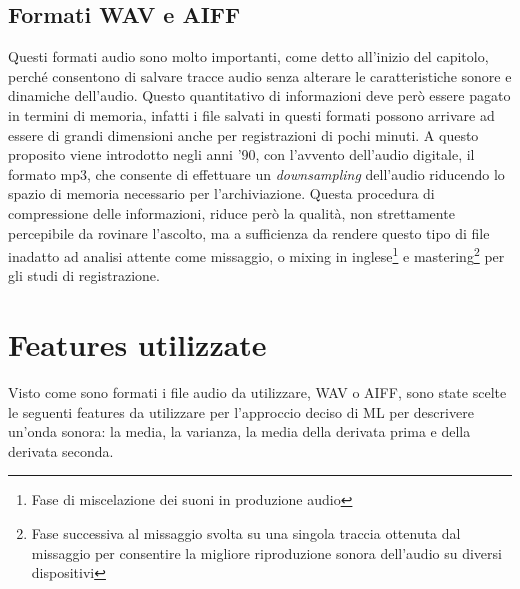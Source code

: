 \subsection{Formati WAV e AIFF}
Questi formati audio sono molto importanti, come detto all'inizio del capitolo, perché consentono di salvare tracce audio senza alterare le caratteristiche sonore e dinamiche dell'audio. Questo quantitativo di informazioni deve però essere pagato in termini di memoria, infatti i file salvati in questi formati possono arrivare ad essere di grandi dimensioni anche per registrazioni di pochi minuti. A questo proposito viene introdotto negli anni '90, con l'avvento dell'audio digitale, il formato mp3, che consente di effettuare un \emph{downsampling} dell'audio riducendo lo spazio di memoria necessario per l'archiviazione. Questa procedura di compressione delle informazioni, riduce però la qualità, non strettamente percepibile da rovinare l'ascolto, ma a sufficienza da rendere questo tipo di file inadatto ad analisi attente come missaggio, o mixing in inglese\footnote{Fase di miscelazione dei suoni in produzione audio} e mastering\footnote{Fase successiva al missaggio svolta su una singola traccia ottenuta dal missaggio per consentire la migliore riproduzione sonora dell'audio su diversi dispositivi} per gli studi di registrazione.

\section{Features utilizzate}
Visto come sono formati i file audio da utilizzare, WAV o AIFF, sono state scelte le seguenti features da utilizzare per l'approccio deciso di ML per descrivere un'onda sonora: la media, la varianza, la media della derivata prima e  della derivata seconda.



%
